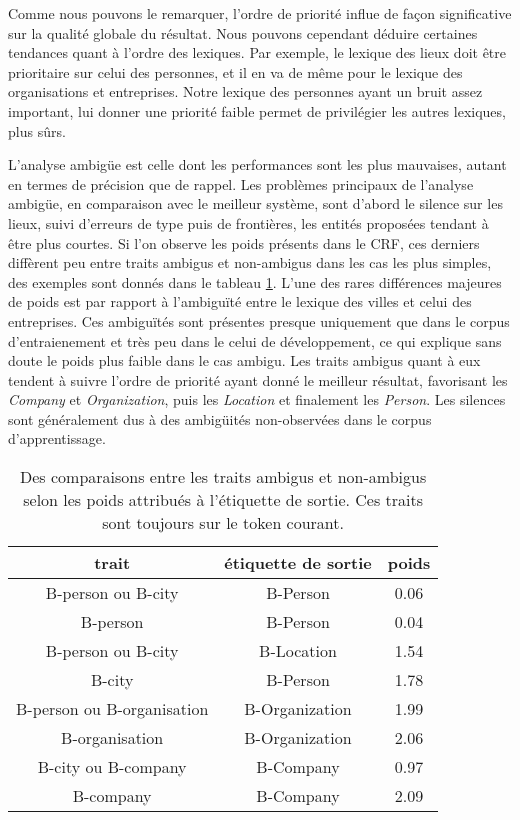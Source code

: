 \documentclass[citation\_needed]{subfiles}
\begin{document}
Comme nous pouvons le remarquer, l'ordre de priorité influe de façon significative sur la qualité globale du résultat. Nous pouvons cependant déduire certaines tendances quant à l'ordre des lexiques. Par exemple, le lexique des lieux doit être prioritaire sur celui des personnes, et il en va de même pour le lexique des organisations et entreprises. Notre lexique des personnes ayant un bruit assez important, lui donner une priorité faible permet de privilégier les autres lexiques, plus sûrs. %

L'analyse ambigüe est celle dont les performances sont les plus mauvaises, autant en termes de précision que de rappel. Les problèmes principaux de l'analyse ambigüe, en comparaison avec le meilleur système, sont d'abord le silence sur les lieux, suivi d'erreurs de type puis de frontières, les entités proposées tendant à être plus courtes. Si l'on observe les poids présents dans le CRF, ces derniers diffèrent peu entre traits ambigus et non-ambigus dans les cas les plus simples, des exemples sont donnés dans le tableau \ref{tab:priorities-examples}. L'une des rares différences majeures de poids est par rapport à l'ambiguïté entre le lexique des villes et celui des entreprises. Ces ambiguïtés sont présentes presque uniquement que dans le corpus d'entraienement et très peu dans le celui de développement, ce qui explique sans doute le poids plus faible dans le cas ambigu. Les traits ambigus quant à eux tendent à suivre l'ordre de priorité ayant donné le meilleur résultat, favorisant les \emph{Company} et \emph{Organization}, puis les \emph{Location} et finalement les \emph{Person}. Les silences sont généralement dus à des ambigüités non-observées dans le corpus d'apprentissage.

\begin{table}
\centering
\begin{tabular}{|c|c|c|}
\hline
trait & étiquette de sortie & poids\\
\hline
B-person ou B-city & B-Person & 0.06\\
B-person & B-Person & 0.04\\
\hline
B-person ou B-city & B-Location & 1.54\\
B-city & B-Person & 1.78\\
\hline
B-person ou B-organisation & B-Organization & 1.99\\
B-organisation & B-Organization & 2.06\\
\hline
B-city ou B-company & B-Company & 0.97\\
B-company & B-Company & 2.09\\
\hline
\end{tabular}
\caption{Des comparaisons entre les traits ambigus et non-ambigus selon les poids attribués à l'étiquette de sortie. Ces traits sont toujours sur le token courant.}
\label{tab:priorities-examples}
\end{table}
\end{document}
